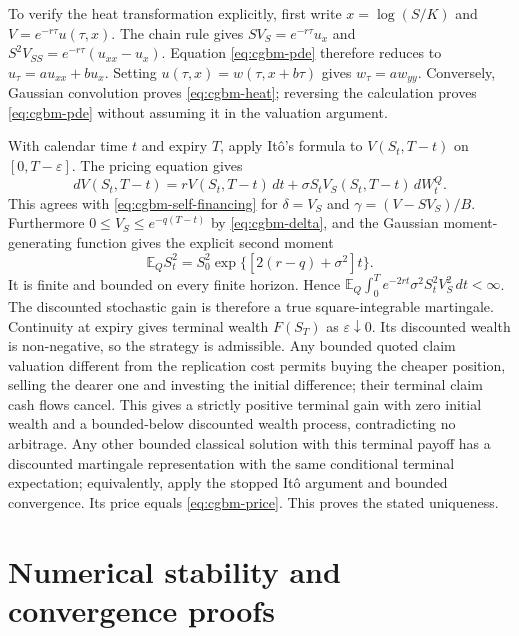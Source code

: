 \documentclass[11pt]{article}
\begin{document}
To verify the heat transformation explicitly, first write
$x=\log(S/K)$ and $V=e^{-r\tau}u(\tau,x)$. The chain rule gives
$SV_S=e^{-r\tau}u_x$ and
$S^2V_{SS}=e^{-r\tau}(u_{xx}-u_x)$. Equation
\eqref{eq:cgbm-pde} therefore reduces to
$u_\tau=a u_{xx}+b u_x$. Setting $u(\tau,x)=w(\tau,x+b\tau)$ gives
$w_\tau=a w_{yy}$. Conversely, Gaussian convolution proves
\eqref{eq:cgbm-heat}; reversing the calculation proves
\eqref{eq:cgbm-pde} without assuming it in the valuation argument.

With calendar time $t$ and expiry $T$, apply It\^o's formula to
$V(S_t,T-t)$ on $[0,T-\varepsilon]$. The pricing equation gives
\begin{equation}
 dV(S_t,T-t)=rV(S_t,T-t)\,dt+
 \sigma S_tV_S(S_t,T-t)\,dW_t^Q.
 \label{eq:cgbm-replication-ito}
\end{equation}
This agrees with \eqref{eq:cgbm-self-financing} for $\delta=V_S$ and
$\gamma=(V-SV_S)/B$. Furthermore
$0\leq V_S\leq e^{-q(T-t)}$ by \eqref{eq:cgbm-delta}, and
the Gaussian moment-generating function gives the explicit second moment
\begin{equation}
 \mathbb E_Q S_t^2=S_0^2
 \exp\{[2(r-q)+\sigma^2]t\}.
 \label{eq:cgbm-asset-second-moment}
\end{equation}
It is finite and bounded on every finite horizon. Hence
$\mathbb E_Q\int_0^T e^{-2rt}\sigma^2 S_t^2 V_S^2\,dt<\infty$.
The discounted stochastic gain is therefore a true square-integrable
martingale. Continuity at expiry gives terminal wealth $F(S_T)$ as
$\varepsilon\downarrow0$. Its discounted wealth is non-negative, so the
strategy is admissible. Any bounded quoted claim valuation different from
the replication cost permits buying the cheaper position, selling the dearer
one and investing the initial difference; their terminal claim cash
flows cancel. This gives a strictly positive terminal gain with zero
initial wealth and a bounded-below discounted wealth process, contradicting
no arbitrage. Any other bounded classical solution with this terminal
payoff has a discounted martingale representation with the same
conditional terminal expectation; equivalently, apply the stopped
It\^o argument and bounded convergence. Its price equals
\eqref{eq:cgbm-price}. This proves the stated uniqueness.

\section{Numerical stability and convergence proofs}
\label{app:cgbm-numerical}
\end{document}
